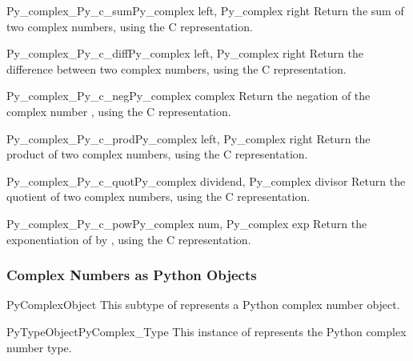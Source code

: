 \documentclass{manual}
\begin{document}
\begin{cfuncdesc}{Py_complex}{_Py_c_sum}{Py_complex left, Py_complex right}
Return the sum of two complex numbers, using the C
 representation.
\end{cfuncdesc}

\begin{cfuncdesc}{Py_complex}{_Py_c_diff}{Py_complex left, Py_complex right}
Return the difference between two complex numbers, using the C
 representation.
\end{cfuncdesc}

\begin{cfuncdesc}{Py_complex}{_Py_c_neg}{Py_complex complex}
Return the negation of the complex number , using the C
 representation.
\end{cfuncdesc}

\begin{cfuncdesc}{Py_complex}{_Py_c_prod}{Py_complex left, Py_complex right}
Return the product of two complex numbers, using the C
 representation.
\end{cfuncdesc}

\begin{cfuncdesc}{Py_complex}{_Py_c_quot}{Py_complex dividend,
                                          Py_complex divisor}
Return the quotient of two complex numbers, using the C
 representation.
\end{cfuncdesc}

\begin{cfuncdesc}{Py_complex}{_Py_c_pow}{Py_complex num, Py_complex exp}
Return the exponentiation of  by , using the C
 representation.
\end{cfuncdesc}


\subsubsection{Complex Numbers as Python Objects}

\begin{ctypedesc}{PyComplexObject}
This subtype of  represents a Python complex number object.
\end{ctypedesc}

\begin{cvardesc}{PyTypeObject}{PyComplex_Type}
This instance of  represents the Python complex 
number type.
\end{cvardesc}
\end{document}
